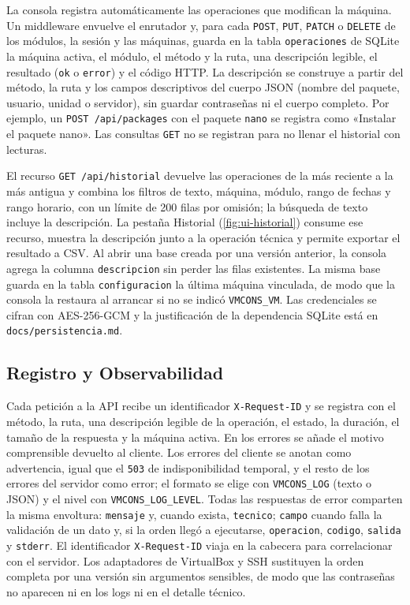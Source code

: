 La consola registra automáticamente las operaciones que modifican la
máquina. Un middleware envuelve el enrutador y, para cada
\texttt{POST}, \texttt{PUT}, \texttt{PATCH} o \texttt{DELETE} de los
módulos, la sesión y las máquinas, guarda en la tabla \texttt{operaciones}
de SQLite la máquina
activa, el módulo, el método y la ruta, una descripción legible, el
resultado (\texttt{ok} o \texttt{error}) y el código HTTP. La
descripción se construye a partir del método, la ruta y los campos
descriptivos del cuerpo JSON (nombre del paquete, usuario, unidad o
servidor), sin guardar contraseñas ni el cuerpo completo. Por ejemplo,
un \texttt{POST /api/packages} con el paquete \texttt{nano} se registra
como «Instalar el paquete nano». Las consultas \texttt{GET} no se
registran para no llenar el historial con lecturas.

El recurso \texttt{GET /api/historial} devuelve las operaciones de la más
reciente a la más antigua y combina los filtros de texto, máquina, módulo,
rango de fechas y rango horario, con un límite de 200 filas por omisión;
la búsqueda de texto incluye la descripción. La pestaña Historial (\cref{fig:ui-historial}) consume ese recurso, muestra la descripción junto a la operación técnica y permite
exportar el resultado a CSV. Al abrir una base creada por una versión
anterior, la consola agrega la columna \texttt{descripcion} sin perder las
filas existentes. La misma base guarda en la tabla
\texttt{configuracion} la última máquina vinculada, de modo que la consola la restaura al arrancar si no se
indicó \texttt{VMCONS\_VM}. Las credenciales se cifran con AES-256-GCM y
la justificación de la dependencia SQLite está en
\texttt{docs/persistencia.md}.

\subsection{Registro y Observabilidad}
\label{sec:observabilidad}

Cada petición a la API recibe un identificador \texttt{X-Request-ID} y se
registra con el método, la ruta, una descripción legible de la operación,
el estado, la duración, el tamaño de la respuesta y la máquina activa. En
los errores se añade el motivo comprensible devuelto al cliente. Los
errores del cliente se anotan como advertencia, igual que el \texttt{503}
de indisponibilidad temporal, y el resto de los errores del servidor como
error; el formato se elige con
\texttt{VMCONS\_LOG} (texto o JSON) y el nivel con
\texttt{VMCONS\_LOG\_LEVEL}. Todas las respuestas de error comparten la
misma envoltura: \texttt{mensaje} y, cuando exista, \texttt{tecnico};
\texttt{campo} cuando falla la validación de un dato y, si la orden llegó a
ejecutarse, \texttt{operacion}, \texttt{codigo}, \texttt{salida} y
\texttt{stderr}. El identificador \texttt{X-Request-ID} viaja en la
cabecera para correlacionar con el servidor. Los adaptadores de
VirtualBox y SSH sustituyen la orden completa por una versión sin
argumentos sensibles, de modo que las contraseñas no aparecen ni en los
logs ni en el detalle técnico.

